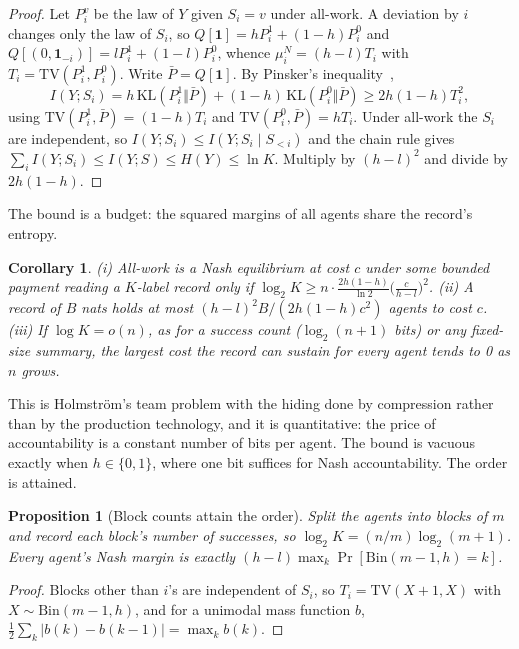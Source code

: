 \documentclass[sigconf,anonymous,acmthm=false]{acmart}
\theoremstyle{acmplain}
\newtheorem{proposition}{Proposition}
\newtheorem{corollary}{Corollary}
\theoremstyle{acmdefinition}
\newcommand{\TV}{\mathrm{TV}}
\begin{document}
\begin{proof}
Let $P_i^v$ be the law of $Y$ given $S_i=v$ under all-work. A deviation by $i$ changes only
the law of $S_i$, so $Q[\mathbf1]=hP_i^1+(1-h)P_i^0$ and
$Q[(0,\mathbf1_{-i})]=lP_i^1+(1-l)P_i^0$, whence $\mu_i^N=(h-l)T_i$ with
$T_i=\TV(P_i^1,P_i^0)$. Write $\bar P=Q[\mathbf1]$. By Pinsker's inequality~\cite{cover2006},
\[ I(Y;S_i)=h\,\mathrm{KL}(P_i^1\Vert\bar P)+(1-h)\,\mathrm{KL}(P_i^0\Vert\bar P)\ge2h(1-h)T_i^2, \]
using $\TV(P_i^1,\bar P)=(1-h)T_i$ and $\TV(P_i^0,\bar P)=hT_i$. Under all-work the $S_i$ are
independent, so $I(Y;S_i)\le I(Y;S_i\mid S_{<i})$ and the chain rule gives
$\sum_iI(Y;S_i)\le I(Y;S)\le H(Y)\le\ln K$. Multiply by $(h-l)^2$ and divide by $2h(1-h)$.
\end{proof}

The bound is a budget: the squared margins of all agents share the record's entropy.

\begin{corollary}\label{cor:noisy}
(i) All-work is a Nash equilibrium at cost $c$ under some bounded payment reading a $K$-label
record only if $\log_2K\ge n\cdot\frac{2h(1-h)}{\ln2}\big(\frac c{h-l}\big)^2$. (ii) A record
of $B$ nats holds at most $(h-l)^2B/(2h(1-h)c^2)$ agents to cost $c$. (iii) If $\log K=o(n)$,
as for a success count ($\log_2(n+1)$ bits) or any fixed-size summary, the largest cost the
record can sustain for every agent tends to 0 as $n$ grows.
\end{corollary}

This is Holmstr\"om's team problem with the hiding done by compression rather than by the
production technology, and it is quantitative: the price of accountability is a constant
number of bits per agent. The bound is vacuous exactly when $h\in\{0,1\}$, where one bit
suffices for Nash accountability. The order is attained.

\begin{proposition}[Block counts attain the order]\label{prop:blocks}
Split the agents into blocks of $m$ and record each block's number of successes, so
$\log_2K=(n/m)\log_2(m+1)$. Every agent's Nash margin is exactly
$(h-l)\max_k\Pr[\mathrm{Bin}(m-1,h)=k]$.
\end{proposition}
\begin{proof}
Blocks other than $i$'s are independent of $S_i$, so $T_i=\TV(X+1,X)$ with
$X\sim\mathrm{Bin}(m-1,h)$, and for a unimodal mass function $b$,
$\frac12\sum_k|b(k)-b(k-1)|=\max_kb(k)$.
\end{proof}
\end{document}

